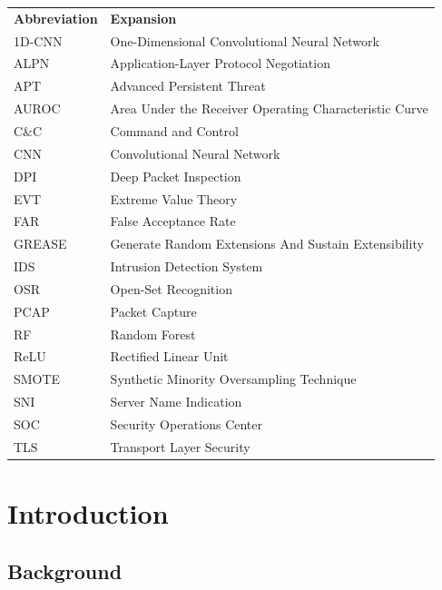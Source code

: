 \documentclass[12pt,a4paper]{report}
\begin{document}
\vspace{0.15cm}
\begin{tabular}{ll}
\textbf{Abbreviation} & \textbf{Expansion} \\
1D-CNN & One-Dimensional Convolutional Neural Network \\
ALPN   & Application-Layer Protocol Negotiation \\
APT    & Advanced Persistent Threat \\
AUROC  & Area Under the Receiver Operating Characteristic Curve \\
C\&C   & Command and Control \\
CNN    & Convolutional Neural Network \\
DPI    & Deep Packet Inspection \\
EVT    & Extreme Value Theory \\
FAR    & False Acceptance Rate \\
GREASE & Generate Random Extensions And Sustain Extensibility \\
IDS    & Intrusion Detection System \\
OSR    & Open-Set Recognition \\
PCAP   & Packet Capture \\
RF     & Random Forest \\
ReLU   & Rectified Linear Unit \\
SMOTE  & Synthetic Minority Oversampling Technique \\
SNI    & Server Name Indication \\
SOC    & Security Operations Center \\
TLS    & Transport Layer Security \\
\end{tabular}


\chapter{Introduction}

\section{Background}
\end{document}
